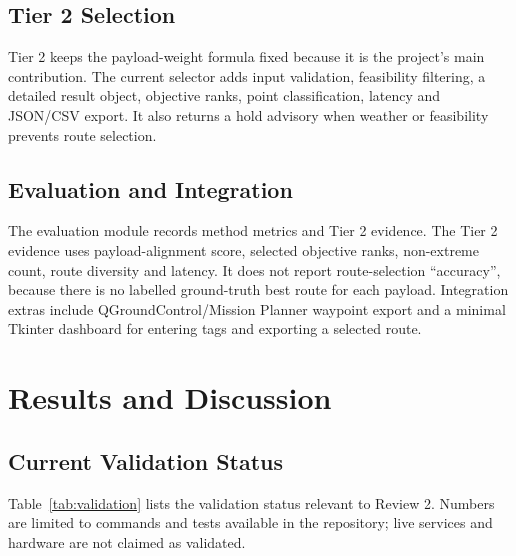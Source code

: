 \documentclass{ssnreview}
\begin{document}
\section{Tier 2 Selection}
Tier 2 keeps the payload-weight formula fixed because it is the project's main contribution. The current selector
adds input validation, feasibility filtering, a detailed result object, objective ranks, point classification,
latency and JSON/CSV export. It also returns a hold advisory when weather or feasibility prevents route selection.

\section{Evaluation and Integration}
The evaluation module records method metrics and Tier 2 evidence. The Tier 2 evidence uses payload-alignment score,
selected objective ranks, non-extreme count, route diversity and latency. It does not report route-selection
``accuracy'', because there is no labelled ground-truth best route for each payload. Integration extras include
QGroundControl/Mission Planner waypoint export and a minimal Tkinter dashboard for entering tags and exporting a
selected route.

\chapter{Results and Discussion}
\section{Current Validation Status}
Table~\ref{tab:validation} lists the validation status relevant to Review 2. Numbers are limited to commands and
tests available in the repository; live services and hardware are not claimed as validated.
\end{document}
